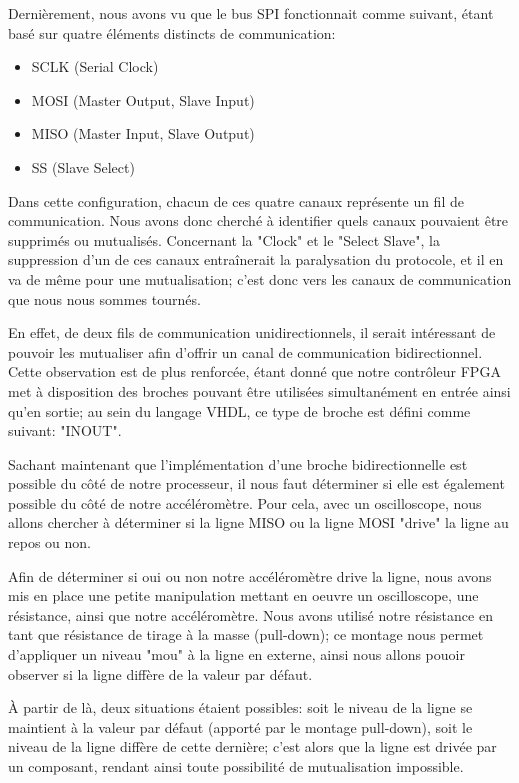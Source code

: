 \documentclass[french,a4paper,12pt]{report}
\begin{document}
	Dernièrement, nous avons vu que le bus SPI fonctionnait comme suivant, étant basé sur quatre éléments distincts de communication:
	
	\begin{itemize}
		\item SCLK (Serial Clock) 
		\item MOSI (Master Output, Slave Input) 
		\item MISO (Master Input, Slave Output) 
		\item SS (Slave Select)
	\end{itemize}
	
	Dans cette configuration, chacun de ces quatre canaux représente un fil de communication. Nous avons donc cherché à identifier quels canaux pouvaient être supprimés ou mutualisés. Concernant la "Clock" et le "Select Slave", la suppression d'un de ces canaux entraînerait la paralysation du protocole, et il en va de même pour une mutualisation; c'est donc vers les canaux de communication que nous nous sommes tournés.
	
	En effet, de deux fils de communication unidirectionnels, il serait intéressant de pouvoir les mutualiser afin d'offrir un canal de communication bidirectionnel. Cette observation est de plus renforcée, étant donné que notre contrôleur FPGA met à disposition des broches pouvant être utilisées simultanément en entrée ainsi qu'en sortie; au sein du langage VHDL, ce type de broche est défini comme suivant: "INOUT".
	
	Sachant maintenant que l'implémentation d'une broche bidirectionnelle est possible du côté de notre processeur, il nous faut déterminer si elle est également possible du côté de notre accéléromètre. Pour cela, avec un oscilloscope, nous allons chercher à déterminer si la ligne MISO ou la ligne MOSI "drive" la ligne au repos ou non.
	
	Afin de déterminer si oui ou non notre accéléromètre drive la ligne, nous avons mis en place une petite manipulation mettant en oeuvre un oscilloscope, une résistance, ainsi que notre accéléromètre. Nous avons utilisé notre résistance en tant que résistance de tirage à la masse (pull-down); ce montage nous permet d'appliquer un niveau "mou" à la ligne en externe, ainsi nous allons pouoir observer si la ligne diffère de la valeur par défaut.	
	
	À partir de là, deux situations étaient possibles: soit le niveau de la ligne se maintient à la valeur par défaut (apporté par le montage pull-down), soit le niveau de la ligne diffère de cette dernière; c'est alors que la ligne est drivée par un composant, rendant ainsi toute possibilité de mutualisation impossible.
	
\end{document}
